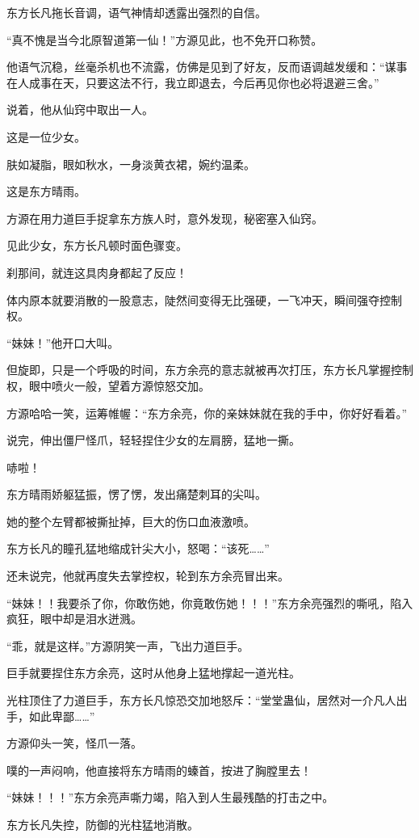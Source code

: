 \begin{this_body}
东方长凡拖长音调，语气神情却透露出强烈的自信。

“真不愧是当今北原智道第一仙！”方源见此，也不免开口称赞。

他语气沉稳，丝毫杀机也不流露，仿佛是见到了好友，反而语调越发缓和：“谋事在人成事在天，只要这法不行，我立即退去，今后再见你也必将退避三舍。”

说着，他从仙窍中取出一人。

这是一位少女。

肤如凝脂，眼如秋水，一身淡黄衣裙，婉约温柔。

这是东方晴雨。

方源在用力道巨手捉拿东方族人时，意外发现，秘密塞入仙窍。

见此少女，东方长凡顿时面色骤变。

刹那间，就连这具肉身都起了反应！

体内原本就要消散的一股意志，陡然间变得无比强硬，一飞冲天，瞬间强夺控制权。

“妹妹！”他开口大叫。

但旋即，只是一个呼吸的时间，东方余亮的意志就被再次打压，东方长凡掌握控制权，眼中喷火一般，望着方源惊怒交加。

方源哈哈一笑，运筹帷幄：“东方余亮，你的亲妹妹就在我的手中，你好好看着。”

说完，伸出僵尸怪爪，轻轻捏住少女的左肩膀，猛地一撕。

哧啦！

东方晴雨娇躯猛振，愣了愣，发出痛楚刺耳的尖叫。

她的整个左臂都被撕扯掉，巨大的伤口血液激喷。

东方长凡的瞳孔猛地缩成针尖大小，怒喝：“该死……”

还未说完，他就再度失去掌控权，轮到东方余亮冒出来。

“妹妹！！我要杀了你，你敢伤她，你竟敢伤她！！！”东方余亮强烈的嘶吼，陷入疯狂，眼中却是泪水迸溅。

“乖，就是这样。”方源阴笑一声，飞出力道巨手。

巨手就要捏住东方余亮，这时从他身上猛地撑起一道光柱。

光柱顶住了力道巨手，东方长凡惊恐交加地怒斥：“堂堂蛊仙，居然对一介凡人出手，如此卑鄙……”

方源仰头一笑，怪爪一落。

噗的一声闷响，他直接将东方晴雨的螓首，按进了胸膛里去！

“妹妹！！！”东方余亮声嘶力竭，陷入到人生最残酷的打击之中。

东方长凡失控，防御的光柱猛地消散。


\end{this_body}
